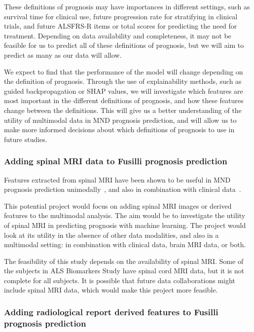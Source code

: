 These definitions of prognosis may have importances in different settings, such as survival time for clinical use, future progression rate for stratifying in clinical trials, and future ALSFRS-R items or total scores for predicting the need for treatment.
Depending on data availability and completeness, it may not be feasible for us to predict all of these definitions of prognosis, but we will aim to predict as many as our data will allow.

We expect to find that the performance of the model will change depending on the definition of prognosis.
Through the use of explainability methods, such as guided backpropagation or SHAP values, we will investigate which features are most important in the different definitions of prognosis, and how these features change between the definitions.
This will give us a better understanding of the utility of multimodal data in MND prognosis prediction, and will allow us to make more informed decisions about which definitions of prognosis to use in future studies.


\subsubsection*{Adding spinal MRI data to Fusilli prognosis prediction}

Features extracted from spinal MRI have been shown to be useful in MND prognosis prediction unimodally~\cite{brancoSpinalCordAtrophy2014, grolezMRICervicalSpinal2018}, and also in combination with clinical data~\cite{querinSpinalCordMultiparametric2017}.

This potential project would focus on adding spinal MRI images or derived features to the multimodal analysis.
The aim would be to investigate the utility of spinal MRI in predicting prognosis with machine learning.
The project would look at its utility in the absence of other data modalities, and also in a multimodal setting: in combination with clinical data, brain MRI data, or both.

The feasibility of this study depends on the availability of spinal MRI.
Some of the subjects in ALS Biomarkers Study have spinal cord MRI data, but it is not complete for all subjects.
It is possible that future data collaborations might include spinal MRI data, which would make this project more feasible.

\subsubsection{Adding radiological report derived features to Fusilli prognosis prediction}

